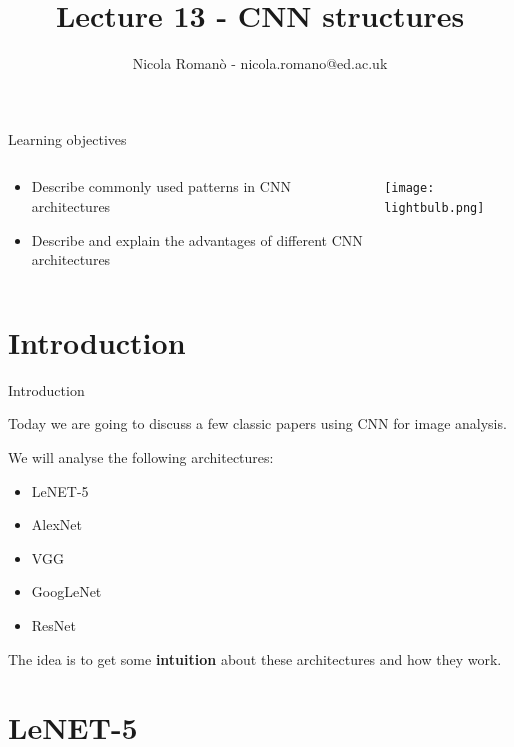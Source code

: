 \documentclass[9pt, aspectratio=169]{beamer}
\author{Nicola Roman\`o - nicola.romano@ed.ac.uk}
\title{Lecture 13 - CNN structures}
\date{}
\begin{document}

\begin{frame}
    \titlepage
\end{frame}

\begin{frame}
    {Learning objectives}
    \begin{columns}
        \begin{column}{0.8\textwidth}
            \begin{itemize}
                \item Describe commonly used patterns in CNN architectures
                \item Describe and explain the advantages of different CNN architectures
            \end{itemize}
        \end{column}
        \begin{column}{0.2\textwidth}
            \texttt{[image: lightbulb.png]}
        \end{column}
    \end{columns}
\end{frame}

\section{Introduction}

\begin{frame}
    {Introduction}

    Today we are going to discuss a few classic papers using CNN for image analysis.

    We will analyse the following architectures:

    \begin{itemize}
        \item LeNET-5
        \item AlexNet
        \item VGG
        \item GoogLeNet
        \item ResNet
    \end{itemize}

    The idea is to get some \textbf{intuition} about these architectures and how they work.
\end{frame}
\section{LeNET-5}
\end{document}
